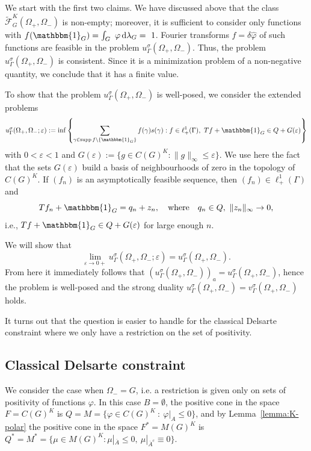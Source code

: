 \documentclass[[a4paper,english,12pt]{amsart}
\theoremstyle{plain}
\theoremstyle{remark}
\newcommand\supp{\operatorname{supp}}
\newcommand{\ff}{\varphi}
\begin{document}
We start with the first two claims. We have discussed above that the class \linebreak $\widetilde{\mathcal{F}}^K_G(\Omega_+, \Omega_-)$ is non-empty; moreover, it is sufficient to consider only functions with $f(\mathbbm{1}_{G}) = \int_G ~ \ff \,\mbox{d} \lambda_G = ~1$. Fourier transforms $f = \delta \widehat{\varphi}$ of such functions are feasible in the problem $u_\Gamma^{\sigma}(\Omega_+, \Omega_-)$. Thus, the problem $u_\Gamma^{\sigma}(\Omega_+, \Omega_-)$ is consistent. Since it is a minimization problem of a non-negative quantity, we conclude that it has a finite value.

To show that the problem $u_\Gamma^{\sigma}(\Omega_+, \Omega_-)$ is well-posed, we consider the extended problems 
$$
u_\Gamma^{\sigma}(\Omega_+, \Omega_-;\varepsilon) := \inf \left\{ \sum_{\gamma \in \supp{f} \setminus \{ \mathbbm{1}_G \}} f(\gamma) s(\gamma) : f \in \ell^1_+(\Gamma), \
Tf + \mathbbm{1}_G \in Q + G(\varepsilon)   \right\}
$$
with $0 < \varepsilon < 1$ and $G(\varepsilon) := \{ g \in C(G)^K : \|g\|_\infty \le \varepsilon \}$. 
We use here the fact that the sets $G(\varepsilon)$ build a basis of neighbourhoods of zero in the topology of $C(G)^K$. If $(f_n)$ is an asymptotically feasible sequence, then $(f_n) \in \ell^1_+(\Gamma)$ and
$$
Tf_n + \mathbbm{1}_G = q_n + z_n, \quad \text{where} \quad q_n \in Q, \ \|z_n\|_{\infty} \to 0,
$$
i.e., $Tf + \mathbbm{1}_G \in Q + G(\varepsilon)$ for large enough $n$.

We will show that
\begin{equation} \label{eq:C_correctly_posed}
\lim_{\varepsilon \to 0+} u_\Gamma^{\sigma}(\Omega_+, \Omega_-;\varepsilon) = u_\Gamma^{\sigma}(\Omega_+, \Omega_-).
\end{equation}
From here it immediately follows that $(u_\Gamma^{\sigma}(\Omega_+, \Omega_-))_a = u_\Gamma^{\sigma}(\Omega_+, \Omega_-)$, hence the problem is well-posed and the strong duality $u_\Gamma^{\sigma}(\Omega_+, \Omega_-) = v_\Gamma^{\sigma}(\Omega_+, \Omega_-)$ holds.

It turns out that the question is easier to handle for the classical Delsarte constraint where we only have a restriction on the set of positivity.

\subsection{Classical Delsarte constraint}

We consider the case when $\Omega_- = G$, i.e. a restriction is given only on sets of positivity of functions $\varphi$. In this case $B = \emptyset$, the positive cone in the space $F = C(G)^{K}$ is $Q = M =\{ \ff \in C(G)^{K}~:~ \ff|_A \le 0\}$, and by Lemma~\ref{lemma:K-polar} the positive cone in the space $F^* = M(G)^{K}$ is $Q^* = M^* = \{ \mu \in M(G)^{K} : \mu|_{\overline{A}} \le 0, \ \mu|_{\overline{A}^c}\equiv 0 \}$.
\end{document}
